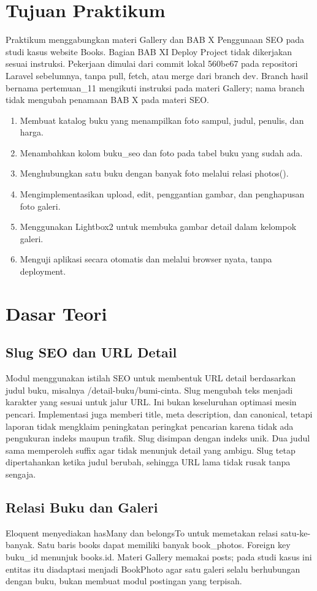\documentclass[a4paper,oneside,12pt]{book}
\begin{document}
\chapter{Tujuan Praktikum}
Praktikum menggabungkan materi Gallery dan BAB X Penggunaan SEO pada studi kasus website Books. Bagian BAB XI Deploy Project tidak dikerjakan sesuai instruksi. Pekerjaan dimulai dari commit lokal 560be67 pada repositori Laravel sebelumnya, tanpa pull, fetch, atau merge dari branch dev. Branch hasil bernama pertemuan\_11 mengikuti instruksi pada materi Gallery; nama branch tidak mengubah penamaan BAB X pada materi SEO.
\begin{enumerate}
\item Membuat katalog buku yang menampilkan foto sampul, judul, penulis, dan harga.
\item Menambahkan kolom buku\_seo dan foto pada tabel buku yang sudah ada.
\item Menghubungkan satu buku dengan banyak foto melalui relasi photos().
\item Mengimplementasikan upload, edit, penggantian gambar, dan penghapusan foto galeri.
\item Menggunakan Lightbox2 untuk membuka gambar detail dalam kelompok galeri.
\item Menguji aplikasi secara otomatis dan melalui browser nyata, tanpa deployment.
\end{enumerate}
\chapter{Dasar Teori}
\section{Slug SEO dan URL Detail}
Modul menggunakan istilah SEO untuk membentuk URL detail berdasarkan judul buku, misalnya /detail-buku/bumi-cinta\cite{modulSeo}. Slug mengubah teks menjadi karakter yang sesuai untuk jalur URL. Ini bukan keseluruhan optimasi mesin pencari. Implementasi juga memberi title, meta description, dan canonical, tetapi laporan tidak mengklaim peningkatan peringkat pencarian karena tidak ada pengukuran indeks maupun trafik.
Slug disimpan dengan indeks unik. Dua judul sama memperoleh suffix agar tidak menunjuk detail yang ambigu. Slug tetap dipertahankan ketika judul berubah, sehingga URL lama tidak rusak tanpa sengaja.
\section{Relasi Buku dan Galeri}
Eloquent menyediakan hasMany dan belongsTo untuk memetakan relasi satu-ke-banyak\cite{eloquent}. Satu baris books dapat memiliki banyak book\_photos. Foreign key buku\_id menunjuk books.id. Materi Gallery memakai posts; pada studi kasus ini entitas itu diadaptasi menjadi BookPhoto agar satu galeri selalu berhubungan dengan buku, bukan membuat modul postingan yang terpisah\cite{modulGallery}.
\end{document}
